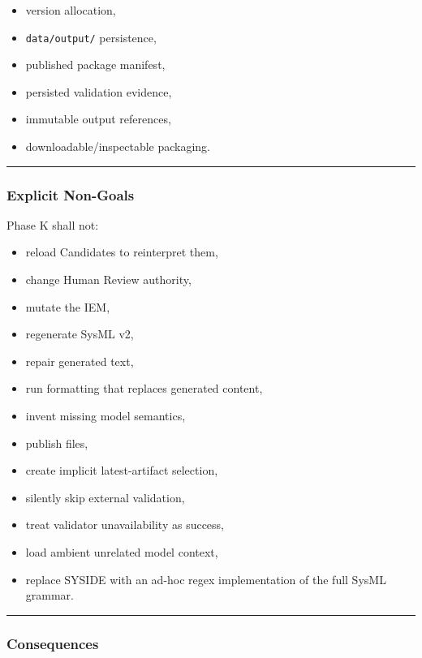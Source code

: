 \begin{itemize}
\tightlist
\item
  version allocation,
\item
  \texttt{data/output/} persistence,
\item
  published package manifest,
\item
  persisted validation evidence,
\item
  immutable output references,
\item
  downloadable/inspectable packaging.
\end{itemize}

\begin{center}\rule{0.5\linewidth}{0.5pt}\end{center}

\hypertarget{explicit-non-goals}{%
\subsubsection{Explicit Non-Goals}\label{explicit-non-goals}}

Phase K shall not:

\begin{itemize}
\tightlist
\item
  reload Candidates to reinterpret them,
\item
  change Human Review authority,
\item
  mutate the IEM,
\item
  regenerate SysML v2,
\item
  repair generated text,
\item
  run formatting that replaces generated content,
\item
  invent missing model semantics,
\item
  publish files,
\item
  create implicit latest-artifact selection,
\item
  silently skip external validation,
\item
  treat validator unavailability as success,
\item
  load ambient unrelated model context,
\item
  replace SYSIDE with an ad-hoc regex implementation of the full SysML grammar.
\end{itemize}

\begin{center}\rule{0.5\linewidth}{0.5pt}\end{center}

\hypertarget{consequences-7}{%
\subsubsection{Consequences}\label{consequences-7}}

